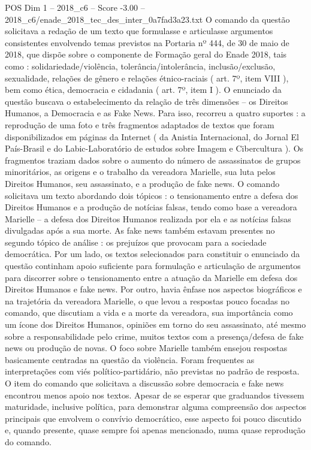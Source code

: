 \begin{textsample}{POS Dim 1 – 2018\_c6 – Score -3.00 – 2018\_c6/enade\_2018\_tec\_des\_inter\_0a7fad3a23.txt}
O comando da questão solicitava a redação de um texto que formulasse e articulasse argumentos consistentes envolvendo temas previstos na Portaria nº 444, de 30 de maio de 2018, que dispõe sobre o componente de Formação geral do Enade 2018, tais como : solidariedade/violência, tolerância/intolerância, inclusão/exclusão, sexualidade, relações de gênero e relações étnico-raciais ( art. 7º, item VIII ), bem como ética, democracia e cidadania ( art. 7º, item I ).
O enunciado da questão buscava o estabelecimento da relação de três dimensões – os Direitos Humanos, a Democracia e as Fake News.
Para isso, recorreu a quatro suportes : a reprodução de uma foto e três fragmentos adaptados de textos que foram disponibilizados em páginas da Internet ( da Anistia Internacional, do Jornal El País-Brasil e do Labic-Laboratório de estudos sobre Imagem e Cibercultura ).
Os fragmentos traziam dados sobre o aumento do número de assassinatos de grupos minoritários, as origens e o trabalho da vereadora Marielle, sua luta pelos Direitos Humanos, seu assassinato, e a produção de fake news.
O comando solicitava um texto abordando dois tópicos : o tensionamento entre a defesa dos Direitos Humanos e a produção de notícias falsas, tendo como base a vereadora Marielle – a defesa dos Direitos Humanos realizada por ela e as notícias falsas divulgadas após a sua morte.
As fake news também estavam presentes no segundo tópico de análise : os prejuízos que provocam para a sociedade democrática.
Por um lado, os textos selecionados para constituir o enunciado da questão continham apoio suficiente para formulação e articulação de argumentos para discorrer sobre o tensionamento entre a atuação da Marielle em defesa dos Direitos Humanos e fake news.
Por outro, havia ênfase nos aspectos biográficos e na trajetória da vereadora Marielle, o que levou a respostas pouco focadas no comando, que discutiam a vida e a morte da vereadora, sua importância como um ícone dos Direitos Humanos, opiniões em torno do seu assassinato, até mesmo sobre a responsabilidade pelo crime, muitos textos com a presença/defesa de fake news ou produção de novas.
O foco sobre Marielle também ensejou respostas basicamente centradas na questão da violência.
Foram frequentes as interpretações com viés político-partidário, não previstas no padrão de resposta.
O item do comando que solicitava a discussão sobre democracia e fake news encontrou menos apoio nos textos.
Apesar de se esperar que graduandos tivessem maturidade, inclusive política, para demonstrar alguma compreensão dos aspectos principais que envolvem o convívio democrático, esse aspecto foi pouco discutido e, quando presente, quase sempre foi apenas mencionado, numa quase reprodução do comando.

\end{textsample}
